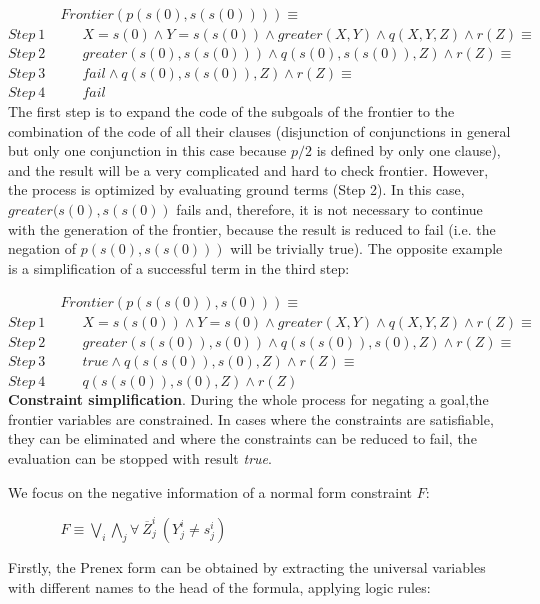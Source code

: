\documentclass{tlp}
\begin{document}
$~~~~~~~~~~~~~~~~~Frontier(p(s(0),s(s(0)))) \equiv $ \\
$Step~ 1~~~~~~~~~~~~{ X=s(0) \wedge Y=s(s(0)) \wedge
  greater(X,Y) \wedge q(X,Y,Z) \wedge r(Z) } \equiv $ \\
$Step~ 2~~~~~~~~~~~~{ greater(s(0),s(s(0))) \wedge q(s(0),s(s(0)),Z) \wedge r(Z) } \equiv $ \\
$Step~ 3~~~~~~~~~~~~{ fail  \wedge q(s(0),s(s(0)),Z) \wedge r(Z) } \equiv $ \\
$Step~ 4~~~~~~~~~~~~fail $ \\

The first step is to expand the code of the subgoals of the frontier
to the combination of the code of all their clauses (disjunction of
conjunctions in general but only one conjunction in this case because
$p/2$ is defined by only one clause), and the result will be a very
complicated and hard to check frontier.  However, the process is
optimized by evaluating ground terms (Step 2). In this case,
$greater(s(0),s(s(0))$ fails and, therefore, it is not necessary to
continue with the generation of the frontier, because the result is
reduced to fail (i.e. the negation of $p (s(0), s(s(0)))$ will be
trivially true). The opposite example is a simplification of a
successful term in the third step:

$~~~~~~~~~~~~~~~~~Frontier(p(s(s(0)),s(0))) \equiv $\\
$Step~ 1~~~~~~~~~~~~{ X=s(s(0)) \wedge Y=s(0) \wedge greater(X,Y) \wedge q(X,Y,Z) \wedge
  r(Z) } \equiv $ \\
$Step~ 2~~~~~~~~~~~~{ greater(s(s(0)),s(0)) \wedge q(s(s(0)),s(0),Z) \wedge r(Z) } \equiv
$ \\
$Step~ 3~~~~~~~~~~~~{ true \wedge q(s(s(0)),s(0),Z) \wedge r(Z) } \equiv $ \\
$Step~ 4~~~~~~~~~~~~{ q(s(s(0)),s(0),Z) \wedge r(Z) } $ \\

\noindent
{\bf Constraint simplification}. During the whole process for negating
a goal,the frontier variables are constrained. In cases where the
constraints are satisfiable, they can be eliminated and where the
constraints can be reduced to fail, the evaluation can be stopped with
result \emph{true}.
 
We focus on the negative information of a normal form constraint $F$:

$~~~~~~~~~~~~~~~~~ F \equiv  \bigvee_i\bigwedge_j \forall~ \overline{Z}_j^i~(Y_j^i \neq s_j^i)$

Firstly, the Prenex form \cite{Shoenfield} can be obtained by
extracting the universal variables with different names to the head of
the formula, applying logic rules:
\end{document}
